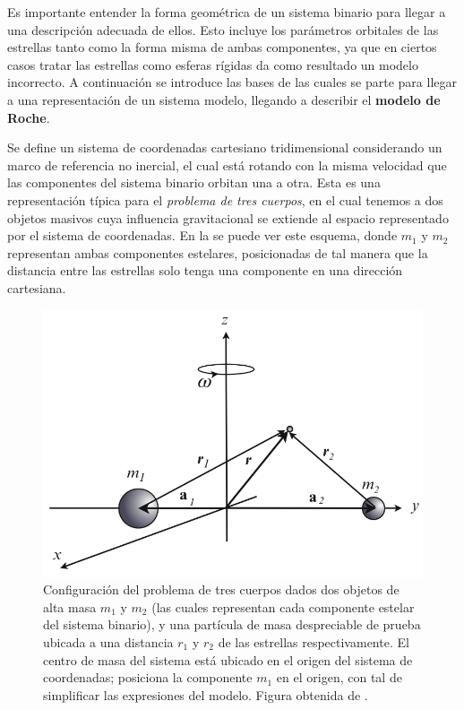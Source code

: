 Es importante entender la forma geométrica de un sistema binario para llegar a
una descripción adecuada de ellos. Esto incluye los parámetros orbitales de las
estrellas tanto como la forma misma de ambas componentes, ya que en ciertos
casos tratar las estrellas como esferas rígidas da como resultado un modelo
incorrecto. A continuación se introduce las bases de las cuales se parte para
llegar a una representación de un sistema modelo, llegando a describir el
\textbf{modelo de Roche}.

Se define un sistema de coordenadas cartesiano tridimensional considerando un
marco de referencia no inercial, el cual está rotando con la misma velocidad que
las componentes del sistema binario orbitan una a otra. Esta es una
representación típica para el \textit{problema de tres cuerpos}, en el cual
tenemos a dos objetos masivos cuya influencia gravitacional se extiende al
espacio representado por el sistema de coordenadas. En la
 se puede ver este esquema, donde $m_1$ y $m_2$
representan ambas componentes estelares, posicionadas de tal manera que la
distancia entre las estrellas solo tenga una componente en una dirección
cartesiana.

\begin{figure}
	\centering
	\includegraphics[scale=0.4]{Introduccion/Figures/Figura Tres Cuerpos_Intro Evolution Single Binary Stars.png}
	\caption{Configuración del problema de tres cuerpos dados dos objetos de
	alta masa $m_1$ y $m_2$ (las cuales representan cada componente estelar del
	sistema binario), y una partícula de masa despreciable de prueba ubicada a
	una distancia $r_1$ y $r_2$ de las estrellas respectivamente. El centro de
	masa del sistema está ubicado en el origen del sistema de coordenadas;
	 posiciona la componente
	$m_1$ en el origen, con tal de simplificar las expresiones del modelo.
	Figura obtenida de
	.}
	\label{figuraTresCuerpos}
\end{figure}

